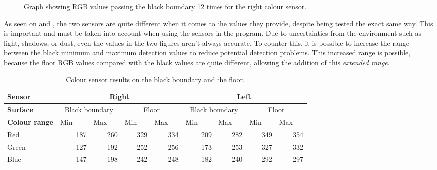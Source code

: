 \begin{figure}[H]
     \caption{\label{fig:colour_sensor_test_right} Graph showing RGB values passing the black boundary 12 times for the right colour sensor.}
\end{figure}

As seen on  and , the two sensors are quite different when it comes to the values they provide, despite being tested the exact same way. This is important and must be taken into account when using the sensors in the program. Due to uncertainties from the environment such as light, shadows, or dust, even the values in the two figures aren't always accurate. To counter this, it is possible to increase the range between the black minimum and maximum detection values to reduce potential detection problems. This increased range is possible, because the floor RGB values compared with the black values are quite different, allowing the addition of this \emph{extended range}.

\begin{table}[H]
	\centering
    \begin{tabular}{|l|r|r|r|r|r|r|r|r|}
    \hline
    \rowcolor{DGray}
    \textbf{Sensor} & \multicolumn{4}{c|}{Right} & \multicolumn{4}{c|}{Left} \\ \hline
    \rowcolor{Gray}
    \textbf{Surface} & \multicolumn{2}{c|}{Black boundary} & \multicolumn{2}{c|}{Floor} & \multicolumn{2}{c|}{Black boundary} & \multicolumn{2}{c|}{Floor}   \\ \hline
    \rowcolor{DGray}
    \textbf{Colour range}  & Min~~~~ & Max~~~ & Min~~~ & Max~~~ & Min~~~~ & Max~~~ & Min~~~ & Max~~~ \\ \hline
\multicolumn{1}{|l|}{Red}  & 187     & 260    & 329    & 334    & 209     & 282    & 349    & 354    \\ \hline
\multicolumn{1}{|l|}{Green}& 127     & 192    & 252    & 256    & 173     & 253    & 327    & 332    \\ \hline
\multicolumn{1}{|l|}{Blue} & 147     & 198    & 242    & 248    & 182     & 240    & 292    & 297    \\
    \hline
    \end{tabular}
    \caption{\label{table:colour_sensor_test} Colour sensor results on the black boundary and the floor.}
\end{table}


